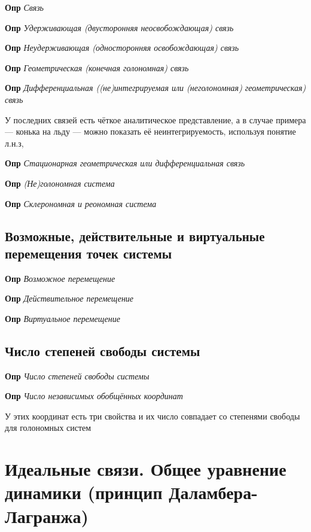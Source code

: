 \documentclass[a4paper, 14pt]{article}
\begin{document}
    \textbf{Опр} \textit{Связь}
    
    \textbf{Опр} \textit{Удерживающая (двусторонняя неосвобождающая) связь}
    
    \textbf{Опр} \textit{Неудерживающая (односторонняя освобождающая) связь}
    
    \textbf{Опр} \textit{Геометрическая (конечная голономная) связь}
    
    \textbf{Опр} \textit{Дифференциальная ((не)интегрируемая или (неголономная) геометрическая) связь}
    
    У последних связей есть чёткое аналитическое представление, а в случае примера --- конька на льду --- можно
    показать её неинтегрируемость, используя понятие л.н.з,
    
    \textbf{Опр} \textit{Стационарная геометрическая или дифференциальная связь}
    
    \textbf{Опр} \textit{(Не)голономная система}
    
    \textbf{Опр} \textit{Склерономная и реономная система}
    
    \subsection{Возможные, действительные и виртуальные перемещения точек системы}
    
    \textbf{Опр} \textit{Возможное перемещение}
    
    \textbf{Опр} \textit{Действительное перемещение}
    
    \textbf{Опр} \textit{Виртуальное перемещение}
    
    \subsection{Число степеней свободы системы}
    
    \textbf{Опр} \textit{Число степеней свободы системы}
    
    \textbf{Опр} \textit{Число независимых обобщённых координат}
    
    У этих координат есть три свойства и их число совпадает со степенями свободы для голономных систем
    
    \section{Идеальные связи.
    Общее уравнение динамики (принцип Даламбера-Лагранжа)}
    
\end{document}

